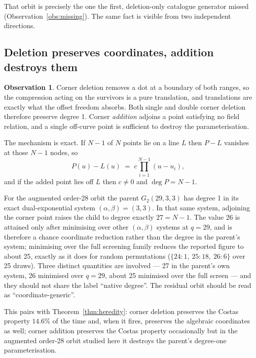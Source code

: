 \documentclass[11pt,a4paper]{article}
\theoremstyle{definition}
\newtheorem{observation}[theorem]{Observation}
\begin{document}
That orbit is precisely the one the first, deletion-only catalogue generator
missed (Observation~\ref{obs:missing}). The same fact is visible from two
independent directions.

\subsection{Deletion preserves coordinates, addition destroys them}

\begin{observation}
\label{obs:delvsadd}
Corner deletion removes a dot at a boundary of both ranges, so the compression
acting on the survivors is a pure translation, and translations are exactly what
the offset freedom absorbs. Both single and double corner deletion therefore
preserve degree 1. Corner \emph{addition} adjoins a point satisfying no field
relation, and a single off-curve point is sufficient to destroy the
parameterisation.
\end{observation}

The mechanism is exact. If $N-1$ of $N$ points lie on a line $L$ then $P-L$
vanishes at those $N-1$ nodes, so
\[
P(u)-L(u) \;=\; c\prod_{i=1}^{N-1}(u-u_i),
\]
and if the added point lies off $L$ then $c\ne0$ and $\deg P = N-1$.

For the augmented order-28 orbit the parent $G_2(29,3,3)$ has degree 1 in its
exact dual-exponential system $(\alpha,\beta)=(3,3)$. In that same system,
adjoining the corner point raises the child to degree exactly $27=N-1$. The value
26 is attained only after minimising over other $(\alpha,\beta)$ systems at
$q=29$, and is therefore a chance coordinate reduction rather than the degree in
the parent's system; minimising over the full screening family reduces the
reported figure to about 25, exactly as it does for random permutations
($\{24{:}1,\ 25{:}18,\ 26{:}6\}$ over 25 draws). Three distinct quantities are
involved --- 27 in the parent's own system, 26 minimised over $q=29$, about 25
minimised over the full screen --- and they should not share the label ``native
degree''. The residual orbit should be read as ``coordinate-generic''.

This pairs with Theorem~\ref{thm:heredity}: corner deletion preserves the Costas
property $14.6\%$ of the time and, when it fires, preserves the algebraic
coordinates as well; corner addition preserves the Costas property occasionally
but in the augmented order-28 orbit studied here it destroys the parent's
degree-one parameterisation.
\end{document}

